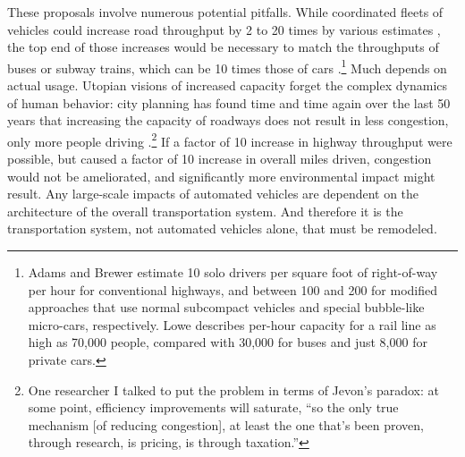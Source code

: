 These proposals involve numerous potential pitfalls. While coordinated
fleets of vehicles could increase road throughput by 2 to 20
times by various estimates \cite[p. 229]{adamsBrewerRoadways}, the top end of those
increases would be necessary to match the 
throughputs of buses or subway trains, which can be 10 times
those of cars \cite[p. 222]{loweCars}.\footnote{Adams and Brewer
  estimate 10 solo drivers per square foot of right-of-way per
  hour for conventional highways, and between 100 and 200 for
  modified approaches that use normal subcompact vehicles and special
  bubble-like micro-cars, respectively. Lowe describes
  per-hour capacity for 
  a rail line as high as 70,000 people, compared with 30,000 for buses
and just 8,000 for private cars.} Much depends on actual usage.
Utopian visions of increased capacity forget the complex dynamics of
human behavior: city planning has found 
time and time again over the last 50 years that increasing the
capacity of roadways does not result in less congestion, only more
people driving \cite[p. 219]{marshallFuture}.\footnote{One researcher I talked
to put the problem in terms of Jevon's paradox: at some point,
efficiency improvements will saturate, ``so the only true mechanism
[of reducing congestion],
at least the one that's been proven, through research, is pricing, is
through taxation.''} If a factor of 10
increase in highway throughput were possible, but caused a factor of
10 increase in overall miles driven, congestion would not be
ameliorated, and significantly more environmental impact might result. Any
large-scale impacts of automated vehicles are dependent on the
architecture of the overall transportation system. And therefore it is
the transportation system, not automated vehicles alone, that must be remodeled.




